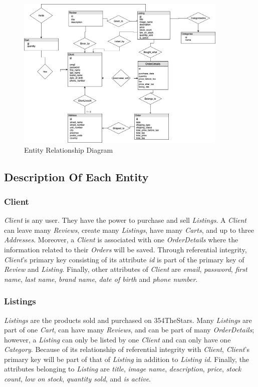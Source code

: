 \documentclass[11pt]{article}
\newcounter{use case ID}
\begin{document}
\begin{figure}[ht!]
    \centering
    \includegraphics[width=0.9\textwidth]{Diagrams/ER/ER_Diagram.png}
    \caption{Entity Relationship Diagram}
    \label{fig:ER}
\end{figure}



\subsection{Description Of Each Entity}

\subsubsection{Client}
\textit{Client} is any user. They have the power to purchase and sell \textit{Listings}. A \textit{Client} can leave many \textit{Reviews}, create many \textit{Listings}, have many \textit{Carts}, and up to three \textit{Addresses}. Moreover, a \textit{Client} is associated with one \textit{OrderDetails} where the information related to their \textit{Orders} will be saved. Through referential integrity, \textit{Client}'s primary key consisting of its attribute \textit{id} is part of the primary key of \textit{Review} and \textit{Listing}. Finally, other attributes of \textit{Client} are \textit{email}, \textit{password}, \textit{first name}, \textit{last name}, \textit{brand name}, \textit{date of birth} and \textit{phone number}.

\subsubsection{Listings}
\textit{Listings} are the products sold and purchased on 354TheStars. Many \textit{Listings} are part of one \textit{Cart}, can have many \textit{Reviews}, and can be part of many \textit{OrderDetails}; however, a \textit{Listing} can only be listed by one \textit{Client} and can only have one \textit{Category}. Because of its relationship of referential integrity with \textit{Client}, \textit{Client}'s primary key will be part of that of \textit{Listing} in addition to \textit{Listing id}. Finally, the attributes belonging to \textit{Listing} are \textit{title}, \textit{image name}, \textit{description}, \textit{price}, \textit{stock count}, \textit{low on stock}, \textit{quantity sold}, and \textit{is active}.
\end{document}
